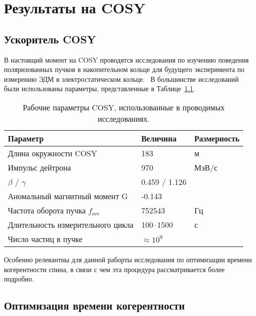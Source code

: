 \chapter{Результаты на COSY}\label{chpt4:top-level}

\section{Ускоритель COSY}


В настоящий момент на COSY проводятся исследования по изучению поведения поляризованных пучков в накопительном кольце для будущего эксперимента по измерению ЭДМ в электростатическом кольце.~\cite{Lehrach:Precursor2012, Lehrach:IPAC15, COSY:SpinTuneMapping, Eversmann:SpinTuneMeasurement, COSY:SCT:1000sec, Wagner:BBA2018}
В большинстве исследований были использованы параметры, представленные в Таблице~\ref{tbl:COSY-studies}.

\begin{table}[h]\centering
	\caption{Рабочие параметры COSY, использованные в проводимых исследованиях.\label{tbl:COSY-studies}}
	\begin{tabular}{lll}
		\toprule
		Параметр & Величина & Размерность \\
		\midrule
		Длина окружности COSY& 183 & м\\
		Импульс дейтрона & 970 & МэВ/с \\
		 $\beta$ / $\gamma$ & 0.459 / 1.126 & \\
		 Аномальный магнитный момент G& -0.143& \\
		 Частота оборота пучка $f_{\mathrm{rev}}$& 752543& Гц\\
		 Длительность измерительного цикла& 100--1500& с\\
		 Число частиц в пучке & $\approx 10^9$& \\
		 \bottomrule
	\end{tabular}
\end{table}



Особенно релевантны для данной раборты исследования по оптимизации времени когерентности спина, в связи с чем эта процедура рассматривается более подробно.
\section{Оптимизация времени когерентности}\label{sec:COSY:SCT-optimization}



\clearpage
